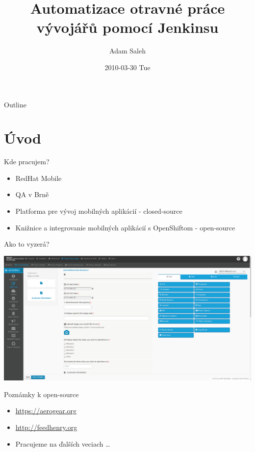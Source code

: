 \documentclass[bigger]{beamer}
\author{Adam Saleh}
\date{2010-03-30 Tue}
\title{Automatizace otravné práce vývojářů pomocí Jenkinsu}
\begin{document}
\maketitle
\begin{frame}{Outline}
\tableofcontents
\end{frame}


\section{Úvod}
\label{sec:orgabc41d2}
\begin{frame}[label={sec:orgd4a544d}]{Kde pracujem?}
\begin{itemize}
\item RedHat Mobile
\item QA v Brně
\item Platforma pre vývoj mobilných aplikácií - \alert{closed-source}
\item Knižnice a integrovanie mobilných aplikácií s OpenShiftom - \alert{open-source}
\end{itemize}
\end{frame}

\begin{frame}[label={sec:orgfe8f319}]{Ako to vyzerá?}
\begin{center}
\includegraphics[width=.9\linewidth]{./forms.png}
\end{center}
\end{frame}

\begin{frame}[label={sec:org62caae0}]{Poznámky k open-source}
\begin{itemize}
\item \url{https://aerogear.org}
\item \url{http://feedhenry.org}
\item Pracujeme na ďalších veciach \ldots{}
\end{itemize}
\end{frame}
\end{document}
